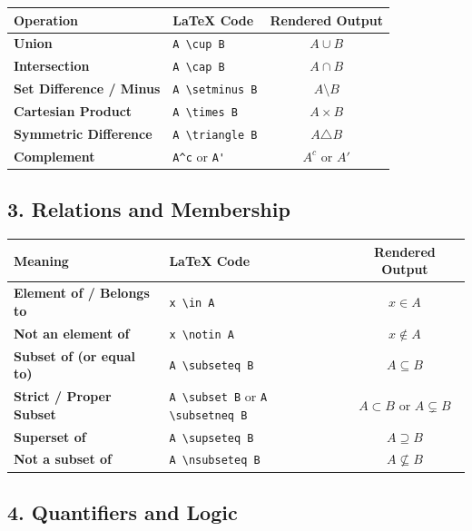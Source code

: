 \documentclass[11pt]{article}
\begin{document}
\begin{table}[H]
\centering
\begin{tabular}{llc}
\toprule
\textbf{Operation} & \textbf{\LaTeX{} Code} & \textbf{Rendered Output} \\
\midrule
\textbf{Union} & \verb|A \cup B| & $A \cup B$ \\
\textbf{Intersection} & \verb|A \cap B| & $A \cap B$ \\
\textbf{Set Difference / Minus} & \verb|A \setminus B| & $A \setminus B$ \\
\textbf{Cartesian Product} & \verb|A \times B| & $A \times B$ \\
\textbf{Symmetric Difference} & \verb|A \triangle B| & $A \triangle B$ \\
\textbf{Complement} & \verb|A^c| or \verb|A'| & $A^c$ or $A'$ \\
\bottomrule
\end{tabular}
\end{table}

\subsection*{3. Relations and Membership}

\begin{table}[H]
\centering
\begin{tabular}{llc}
\toprule
\textbf{Meaning} & \textbf{\LaTeX{} Code} & \textbf{Rendered Output} \\
\midrule
\textbf{Element of / Belongs to} & \verb|x \in A| & $x \in A$ \\
\textbf{Not an element of} & \verb|x \notin A| & $x \notin A$ \\
\textbf{Subset of (or equal to)} & \verb|A \subseteq B| & $A \subseteq B$ \\
\textbf{Strict / Proper Subset} & \verb|A \subset B| or \verb|A \subsetneq B| & $A \subset B$ or $A \subsetneq B$ \\
\textbf{Superset of} & \verb|A \supseteq B| & $A \supseteq B$ \\
\textbf{Not a subset of} & \verb|A \nsubseteq B| & $A \nsubseteq B$ \\
\bottomrule
\end{tabular}
\end{table}

\subsection*{4. Quantifiers and Logic}
\end{document}
